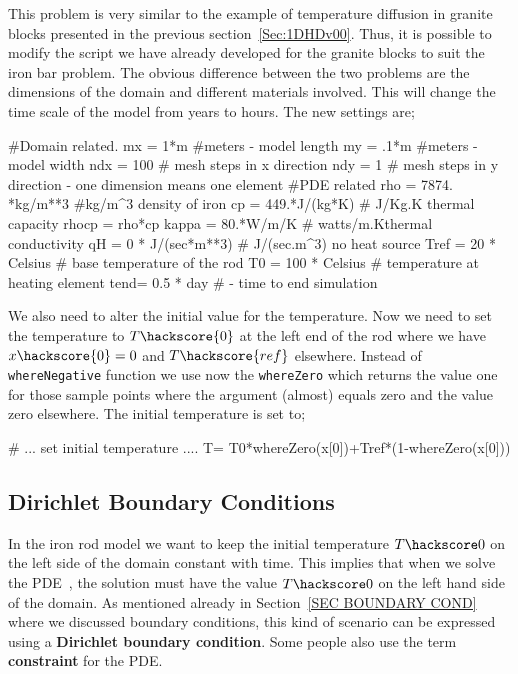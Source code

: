 This problem is very similar to the example of temperature diffusion in granite blocks presented in the previous section~\ref{Sec:1DHDv00}. Thus, it is possible to modify the script we have already developed for the granite blocks to suit the iron bar problem.  
The obvious difference between the two problems are the dimensions of the domain and different materials involved. This will change the time scale of the model from years to hours. 
The new settings are;
\begin{python}
#Domain related.
mx = 1*m #meters - model length
my = .1*m #meters - model width
ndx = 100 # mesh steps in x direction 
ndy = 1 # mesh steps in y direction - one dimension means one element
#PDE related
rho = 7874. *kg/m**3 #kg/m^{3} density of iron
cp = 449.*J/(kg*K) # J/Kg.K thermal capacity
rhocp = rho*cp 
kappa = 80.*W/m/K   # watts/m.Kthermal conductivity
qH = 0 * J/(sec*m**3) # J/(sec.m^{3}) no heat source
Tref = 20 * Celsius  # base temperature of the rod
T0 = 100 * Celsius # temperature at heating element
tend= 0.5 * day # - time to end simulation
\end{python}
We also need to alter the initial value for the temperature. Now we need to set the 
temperature to $T\hackscore{0}$ at the left end of the rod where we have $x\hackscore{0}=0$ and 
$T\hackscore{ref}$ elsewhere. Instead of \verb|whereNegative| function we use now the 
\verb|whereZero| which returns the value one for those sample points where 
the argument (almost) equals zero and the value zero elsewhere. The initial
temperature is set to;
\begin{python}
# ... set initial temperature ....
T= T0*whereZero(x[0])+Tref*(1-whereZero(x[0]))
\end{python}

\subsection{Dirichlet Boundary Conditions}
In the iron rod model  we want to keep the initial temperature $T\hackscore0$ on the left side of the domain constant with time. 
This implies that when we solve the PDE~, the solution must have the value $T\hackscore0$ on the left hand
side of the domain. As mentioned already in Section~\ref{SEC BOUNDARY COND} where we discussed
boundary conditions, this kind of scenario can be expressed using a \textbf{Dirichlet boundary condition}. Some people also
use the term \textbf{constraint} for the PDE. 

